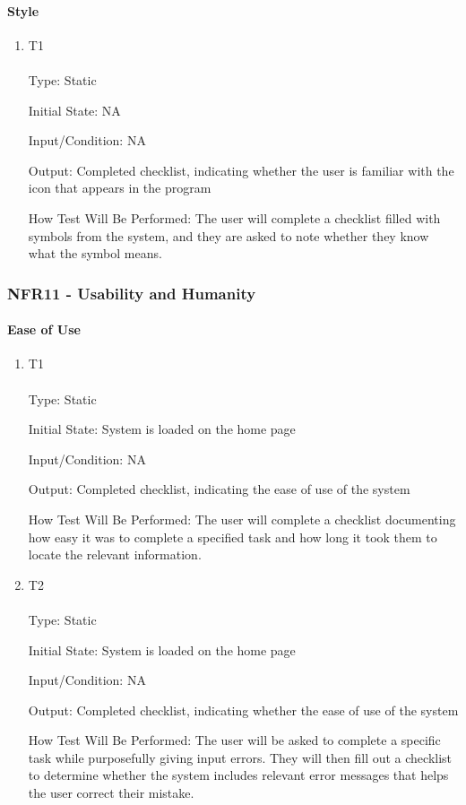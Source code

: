 \documentclass[12pt, titlepage]{article}
\begin{document}
\paragraph{Style}
\begin{enumerate}
\item {T1\\}\\
Type: Static

Initial State: NA

Input/Condition: NA

Output: Completed checklist, indicating whether the user is familiar with the icon that appears in the program

How Test Will Be Performed: The user will complete a checklist filled with symbols from the system, and they are asked to note whether they know what the symbol means.
\end{enumerate}
\subsubsection{NFR11 - Usability and Humanity}
\paragraph{Ease of Use}
\begin{enumerate}
\item {T1\\}\\
Type: Static

Initial State: System is loaded on the home page

Input/Condition: NA

Output: Completed checklist, indicating the ease of use of the system

How Test Will Be Performed: The user will complete a checklist documenting how easy it was to complete a specified task and how long it took them to locate the relevant information.
\item {T2\\}\\
Type: Static

Initial State: System is loaded on the home page

Input/Condition: NA

Output: Completed checklist, indicating whether the ease of use of the system

How Test Will Be Performed: The user will be asked to complete a specific task while purposefully giving input errors. They will then fill out a checklist to determine whether the system includes relevant error messages that helps the user correct their mistake.
\end{enumerate}
\end{document}
